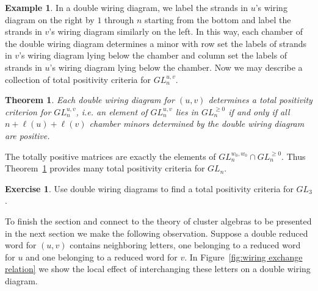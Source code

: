 \documentclass{amsart}
\newtheorem{subtheorem}{Theorem}[theorem]
\theoremstyle{definition}
\newtheorem{example}[theorem]{Example}
\newtheorem{subexercise}{Exercise}[theorem]
\theoremstyle{remark}
\numberwithin{equation}{section}
\begin{document}
\begin{example}
    In a double wiring diagram, we label the strands in $u$'s wiring diagram on the right by $1$ through $n$ starting from the bottom and label the strands in $v$'s wiring diagram similarly on the left.  In this way, each chamber of the double wiring diagram determines a minor with row set the labels of strands in $v$'s wiring diagram lying below the chamber and column set the labels of strands in $u$'s wiring diagram lying below the chamber.  Now we may describe a collection of total positivity criteria for $GL_n^{u,v}$.
    \setcounter{subtheorem}{3}
    \begin{subtheorem}\label{th:total positivity criteria}\cite{FZ99}
      Each double wiring diagram for $(u,v)$ determines a total positivity criterion for $GL_n^{u,v}$, i.e. an element of $GL_n^{u,v}$ lies in $GL_n^{\ge0}$ if and only if all $n+\ell(u)+\ell(v)$ chamber minors determined by the double wiring diagram are positive.
    \end{subtheorem}
    The totally positive matrices are exactly the elements of $GL_n^{w_0,w_0}\cap GL_n^{\ge0}$.  Thus Theorem~\ref{th:total positivity criteria} provides many total positivity criteria for $GL_n$.
    \setcounter{subexercise}{4}
    \begin{subexercise}
      Use double wiring diagrams to find a total positivity criteria for $GL_3$.
    \end{subexercise}
    To finish the section and connect to the theory of cluster algebras to be presented in the next section we make the following observation.  Suppose a double reduced word for $(u,v)$ contains neighboring letters, one belonging to a reduced word for $u$ and one belonging to a reduced word for $v$.  In Figure~\ref{fig:wiring exchange relation} we show the local effect of interchanging these letters on a double wiring diagram. 
    \begin{figure}[h]
\end{figure}
\end{example}
\end{document}
